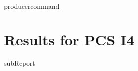 {{ producercommand }}
\renewcommand{\DTRPcs}{I4} %
\renewcommand{\DTRPcsLong}{I4}


    \section{Results for PCS \DTRPcsLong}

    {{subReport}}
    \newpage

